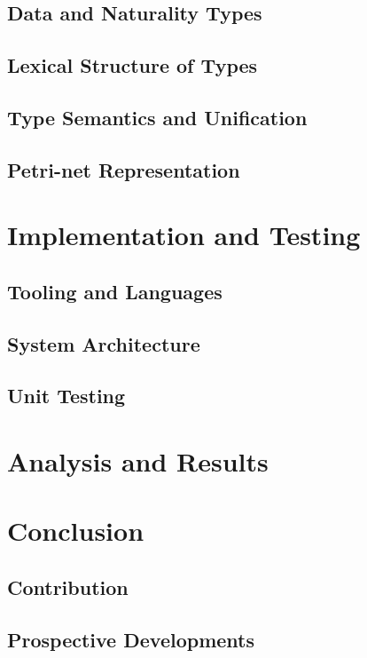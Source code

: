 \documentclass[11pt,openright,hidelinks,a4paper]{article}
\begin{document}
\subsection{Data and Naturality Types}
\subsection{Lexical Structure of Types}
\subsection{Type Semantics and Unification}
\subsection{Petri-net Representation}

\section{Implementation and Testing}
\subsection{Tooling and Languages}
\subsection{System Architecture}
\subsection{Unit Testing}

\section{Analysis and Results}

\section{Conclusion}
\subsection{Contribution}
\subsection{Prospective Developments}
\end{document}
